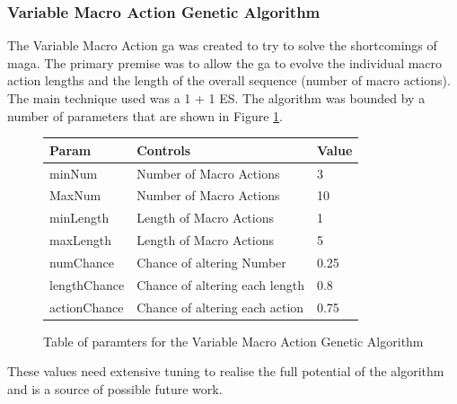 \documentclass{IEEEtran}
\begin{document}
\subsubsection*{Variable Macro Action Genetic Algorithm}
The Variable Macro Action \gls{ga} was created to try to solve the shortcomings of \gls{maga}. The primary premise was to allow the \gls{ga} to evolve the individual macro action lengths and the length of the overall sequence (number of macro actions). The main technique used was a 1 + 1 ES. The algorithm was bounded by a number of parameters that are shown in Figure \ref{vmagaTable}.

\begin{figure}[h]
\centering
\begin{tabular}{| l | l | l |}
\hline
\textbf{Param} & \textbf{Controls} & \textbf{Value} \\
\hline
minNum & Number of Macro Actions & 3 \\
MaxNum & Number of Macro Actions & 10 \\
minLength & Length of Macro Actions & 1 \\
maxLength & Length of Macro Actions & 5 \\
numChance & Chance of altering Number & 0.25 \\
lengthChance & Chance of altering each length & 0.8 \\
actionChance & Chance of altering each action & 0.75 \\
\hline
\end{tabular}
\caption{Table of paramters for the Variable Macro Action Genetic Algorithm}
\label{vmagaTable}
\end{figure}
These values need extensive tuning to realise the full potential of the algorithm and is a source of possible future work.



\end{document}
